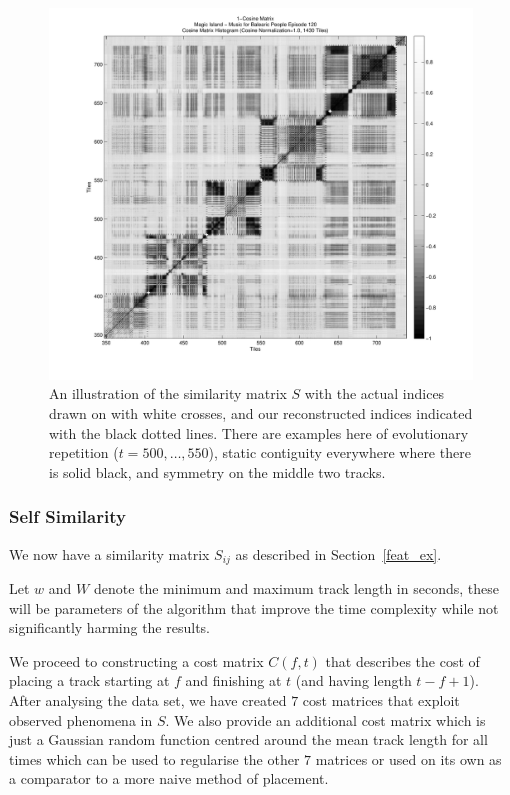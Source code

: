 \documentclass[twocolumn]{article}
\begin{document}
	\begin{figure}[t]
		\centering
		\includegraphics[width=1.08\textwidth]{images/S}
		\caption{An illustration of the similarity matrix $S$ with the actual indices drawn on with white crosses, and our reconstructed indices indicated with the black dotted lines. There are examples here of evolutionary repetition ($t=500,\ldots,550$), static contiguity everywhere where there is solid black, and symmetry on the middle two tracks.}
		\label{fig:simmatrix}
	\end{figure} 
	
	\subsubsection{Self Similarity}\label{costmatrix_sec} %
	
	We now have a similarity matrix $S_{ij}$ as described in Section~\ref{feat_ex}. 
	
	Let $w$ and $W$ denote the minimum and maximum track length in seconds, these will be parameters of the algorithm that improve the time complexity while not significantly harming the results. 
	
We proceed to constructing a cost matrix $C(f,t)$ that describes the
cost of placing a track starting at $f$ and finishing at $t$ (and
having length $t-f+1$). After analysing the data set, we have created
$7$ cost matrices that exploit observed phenomena in $S$. We also
provide an additional cost matrix which is just a Gaussian random
function centred around the mean track length for all times which can
be used to regularise the other $7$ matrices or used on its own as a
comparator to a more naive method of placement.
	
\end{document}

